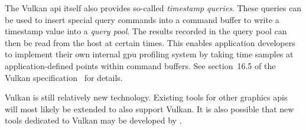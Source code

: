     The Vulkan \gls{api} itself also provides so-called \textit{timestamp queries}.
    These queries can be used to insert special query commands into a command buffer to write a timestamp value into a \textit{query pool}.
    The results recorded in the query pool can then be read from the host at certain times.
    This enables application developers to implement their own internal \acrshort{gpu} profiling system by taking time samples at application-defined points within command buffers.
    See section~16.5 of the Vulkan specification~\cite{vkspec} for details.

    Vulkan is still relatively new technology.
    Existing tools for other graphics \glspl{api} will most likely be extended to also support Vulkan.
    It is also possible that new tools dedicated to Vulkan may be developed by .
